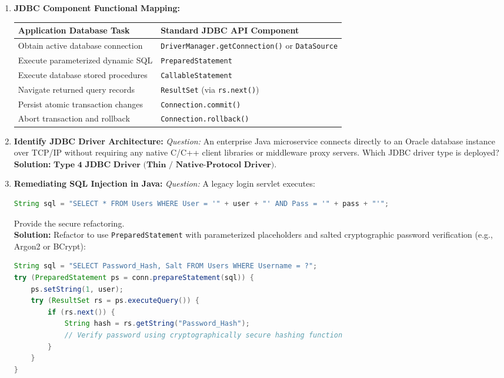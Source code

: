 \begin{enumerate}[resume*]
\item \textbf{JDBC Component Functional Mapping:}
\begin{table}[htbp]
\centering
\small
\begin{tabularx}{0.85\textwidth}{l X}
\toprule
\textbf{Application Database Task} & \textbf{Standard JDBC API Component} \\
\midrule
Obtain active database connection & \texttt{DriverManager.getConnection()} or \texttt{DataSource} \\
Execute parameterized dynamic SQL & \texttt{PreparedStatement} \\
Execute database stored procedures & \texttt{CallableStatement} \\
Navigate returned query records & \texttt{ResultSet} (via \texttt{rs.next()}) \\
Persist atomic transaction changes & \texttt{Connection.commit()} \\
Abort transaction and rollback & \texttt{Connection.rollback()} \\
\bottomrule
\end{tabularx}
\end{table}

\item \textbf{Identify JDBC Driver Architecture:}
\textit{Question:} An enterprise Java microservice connects directly to an Oracle database instance over TCP/IP without requiring any native C/C++ client libraries or middleware proxy servers. Which JDBC driver type is deployed? \\
\textbf{Solution:} $\boxed{\textbf{Type 4 JDBC Driver (Thin / Native-Protocol Driver)}}$.

\item \textbf{Remediating SQL Injection in Java:}
\textit{Question:} A legacy login servlet executes:
\begin{lstlisting}[language=Java]
String sql = "SELECT * FROM Users WHERE User = '" + user + "' AND Pass = '" + pass + "'";
\end{lstlisting}
Provide the secure refactoring. \\
\textbf{Solution:} Refactor to use \texttt{PreparedStatement} with parameterized placeholders and salted cryptographic password verification (e.g., Argon2 or BCrypt):
\begin{lstlisting}[language=Java]
String sql = "SELECT Password_Hash, Salt FROM Users WHERE Username = ?";
try (PreparedStatement ps = conn.prepareStatement(sql)) {
    ps.setString(1, user);
    try (ResultSet rs = ps.executeQuery()) {
        if (rs.next()) {
            String hash = rs.getString("Password_Hash");
            // Verify password using cryptographically secure hashing function
        }
    }
}
\end{lstlisting}
\end{enumerate}


